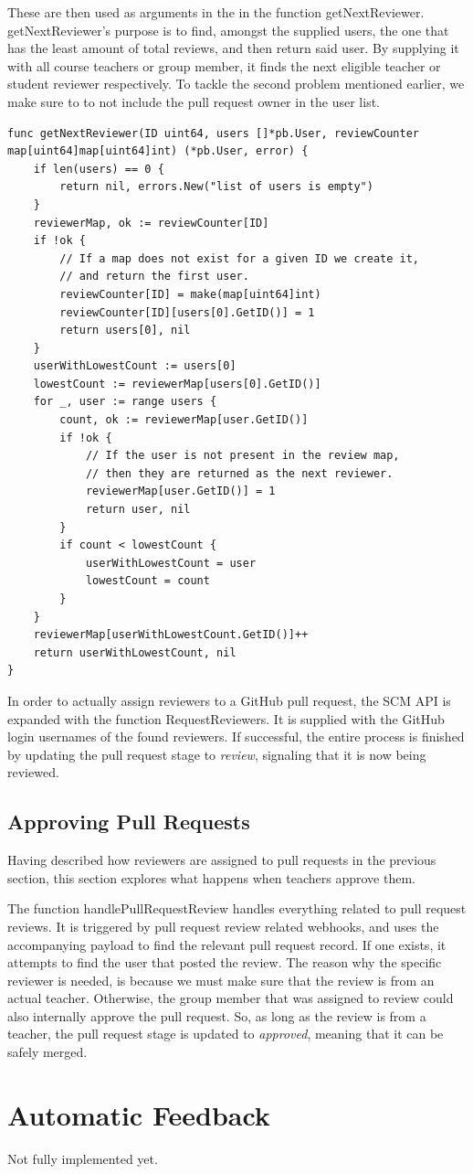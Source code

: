 These are then used as arguments in the in the function getNextReviewer.
getNextReviewer's purpose is to find, amongst the supplied users, the one that has the least amount of total reviews, and then return said user.
By supplying it with all course teachers or group member, it finds the next eligible teacher or student reviewer respectively.
To tackle the second problem mentioned earlier, we make sure to to not include the pull request owner in the user list.
\begin{lstlisting}[caption={The getNextReviewer function}, language=Golang]
func getNextReviewer(ID uint64, users []*pb.User, reviewCounter map[uint64]map[uint64]int) (*pb.User, error) {
	if len(users) == 0 {
		return nil, errors.New("list of users is empty")
	}
	reviewerMap, ok := reviewCounter[ID]
	if !ok {
		// If a map does not exist for a given ID we create it,
		// and return the first user.
		reviewCounter[ID] = make(map[uint64]int)
		reviewCounter[ID][users[0].GetID()] = 1
		return users[0], nil
	}
	userWithLowestCount := users[0]
	lowestCount := reviewerMap[users[0].GetID()]
	for _, user := range users {
		count, ok := reviewerMap[user.GetID()]
		if !ok {
			// If the user is not present in the review map,
			// then they are returned as the next reviewer.
			reviewerMap[user.GetID()] = 1
			return user, nil
		}
		if count < lowestCount {
			userWithLowestCount = user
			lowestCount = count
		}
	}
	reviewerMap[userWithLowestCount.GetID()]++
	return userWithLowestCount, nil
}
\end{lstlisting}

In order to actually assign reviewers to a GitHub pull request, the SCM API is expanded with the function RequestReviewers.
It is supplied with the GitHub login usernames of the found reviewers.
If successful, the entire process is finished by updating the pull request stage to \textit{review}, signaling that it is now being reviewed.

\subsection{Approving Pull Requests}

Having described how reviewers are assigned to pull requests in the previous section, this section explores what happens when teachers approve them.

The function handlePullRequestReview handles everything related to pull request reviews.
It is triggered by pull request review related webhooks, and uses the accompanying payload to find the relevant pull request record.
If one exists, it attempts to find the user that posted the review.
The reason why the specific reviewer is needed, is because we must make sure that the review is from an actual teacher.
Otherwise, the group member that was assigned to review could also internally approve the pull request.
So, as long as the review is from a teacher, the pull request stage is updated to \textit{approved}, meaning that it can be safely merged.

\section{Automatic Feedback}

Not fully implemented yet.